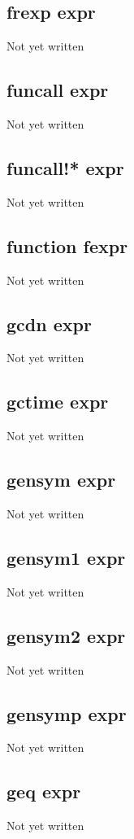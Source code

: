 \documentclass[a4paper,11pt]{article}
\begin{document}
\subsection{\ttfamily frexp expr}
Not yet written

\subsection{\ttfamily funcall expr}
Not yet written

\subsection{\ttfamily funcall!* expr}
Not yet written

\subsection{\ttfamily function fexpr}
Not yet written

\subsection{\ttfamily gcdn expr}
Not yet written

\subsection{\ttfamily gctime expr}
Not yet written

\subsection{\ttfamily gensym expr}
Not yet written

\subsection{\ttfamily gensym1 expr}
Not yet written

\subsection{\ttfamily gensym2 expr}
Not yet written

\subsection{\ttfamily gensymp expr}
Not yet written

\subsection{\ttfamily geq expr}
Not yet written
\end{document}
